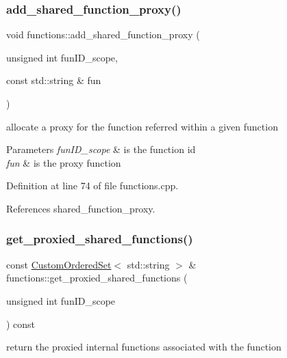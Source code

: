 \subsubsection{\texorpdfstring{add\+\_\+shared\+\_\+function\+\_\+proxy()}{add\_shared\_function\_proxy()}}
{\footnotesize\ttfamily void functions\+::add\+\_\+shared\+\_\+function\+\_\+proxy (\begin{DoxyParamCaption}\item[{unsigned int}]{fun\+I\+D\+\_\+scope,  }\item[{const std\+::string \&}]{fun }\end{DoxyParamCaption})}



allocate a proxy for the function referred within a given function 


\begin{DoxyParams}{Parameters}
{\em fun\+I\+D\+\_\+scope} & is the function id \\
\hline
{\em fun} & is the proxy function \\
\hline
\end{DoxyParams}


Definition at line 74 of file functions.\+cpp.



References shared\+\_\+function\+\_\+proxy.

\mbox{\label{classfunctions_a0dc27d773ab21876d91082e54b100780}} 
\subsubsection{\texorpdfstring{get\+\_\+proxied\+\_\+shared\+\_\+functions()}{get\_proxied\_shared\_functions()}}
{\footnotesize\ttfamily const \hyperlink{classCustomOrderedSet}{Custom\+Ordered\+Set}$<$ std\+::string $>$ \& functions\+::get\+\_\+proxied\+\_\+shared\+\_\+functions (\begin{DoxyParamCaption}\item[{unsigned int}]{fun\+I\+D\+\_\+scope }\end{DoxyParamCaption}) const}



return the proxied internal functions associated with the function 


